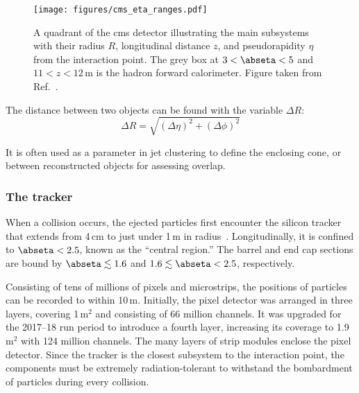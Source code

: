 \begin{figure}[htbp]
    \centering
    \texttt{[image: figures/cms\_eta\_ranges.pdf]}
    \caption[A quadrant of the CMS detector illustrating the main subsystems with their radius $R$, longitudinal distance $z$, and pseudorapidity $\eta$ from the interaction point]{A quadrant of the \acrshort{cms} detector illustrating the main subsystems with their radius $R$, longitudinal distance $z$, and pseudorapidity $\eta$ from the interaction point. The grey box at $\text{3} < \abseta < \text{5}$ and $\text{11} < z < \text{12}$\,m is the hadron forward calorimeter. Figure taken from Ref.~.}
    \label{fig:cms_eta_bounds}
\end{figure}

The distance between two objects can be found with the variable $\Delta R$:
\begin{equation}
\Delta R = \sqrt{(\Delta \eta)^2 + (\Delta \phi)^2}
\label{eq:delta_r}
\end{equation}

It is often used as a parameter in \gls{jet} clustering to define the enclosing cone, or between reconstructed objects for assessing overlap.




\subsubsection{The tracker}
\label{subsubsec:cms_tracker}

When a collision occurs, the ejected particles first encounter the silicon tracker that extends from 4\,cm to just under 1\,m in radius~\cite{Karimäki:368412,CERN-LHCC-2000-016}. Longitudinally, it is confined to $\abseta < \text{2.5}$, known as the ``central region.'' The barrel and end cap sections are bound by $\abseta \lesssim \text{1.6}$ and $\text{1.6} \lesssim \abseta < \text{2.5}$, respectively.

Consisting of tens of millions of pixels and microstrips, the positions of particles can be recorded to within 10\,\si{\micro}m. Initially, the pixel detector was arranged in three layers, covering 1\,m$^2$ and consisting of 66 million channels. It was upgraded for the 2017--18 run period to introduce a fourth layer, increasing its coverage to 1.9\,m$^2$ with 124 million channels. The many layers of strip modules enclose the pixel detector. Since the tracker is the closest subsystem to the interaction point, the components must be extremely radiation-tolerant to withstand the bombardment of particles during every collision.

